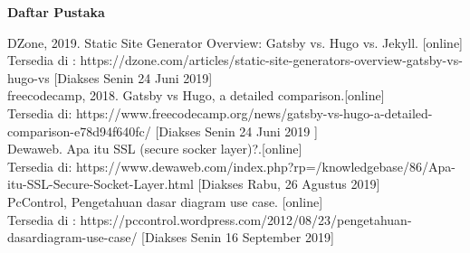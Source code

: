 \begin{center}
    \textbf{Daftar Pustaka}
\end{center}

\noindent [1] DZone, 2019. Static Site Generator Overview: Gatsby vs. Hugo vs. Jekyll. [online]\\
 Tersedia di : https://dzone.com/articles/static-site-generators-overview-gatsby-vs-hugo-vs [Diakses Senin 24 Juni 2019]\\
\noindent [2] freecodecamp, 2018. Gatsby vs Hugo, a detailed comparison.[online] 
\\Tersedia di: https://www.freecodecamp.org/news/gatsby-vs-hugo-a-detailed-comparison-e78d94f640fc/  [Diakses Senin 24 Juni 2019 ]\\
\noindent [3] Dewaweb. Apa itu SSL (secure socker layer)?.[online] 
\\Tersedia di:  https://www.dewaweb.com/index.php?rp=/knowledgebase/86/Apa-itu-SSL-Secure-Socket-Layer.html [Diakses Rabu, 26 Agustus 2019]\\
\noindent [4] PcControl, Pengetahuan dasar diagram use case. [online] 
\\Tersedia di : https://pccontrol.wordpress.com/2012/08/23/pengetahuan-dasardiagram-use-case/ [Diakses Senin 16 September 2019]\\